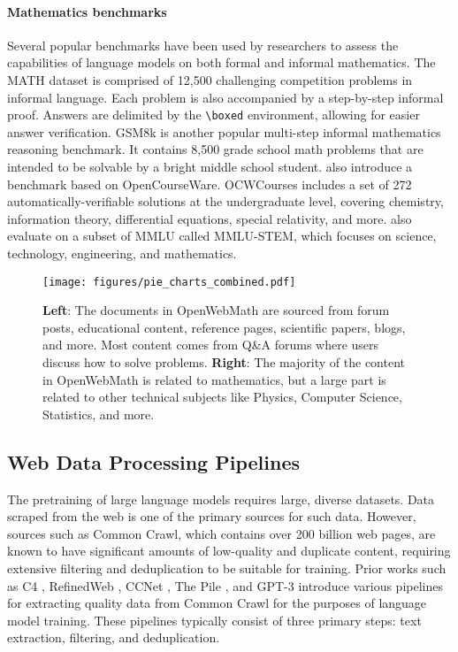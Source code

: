 \paragraph{Mathematics benchmarks} Several popular benchmarks have been used by researchers to assess the capabilities of language models on both formal and informal mathematics. The MATH dataset \citep{mathdataset} is comprised of 12,500 challenging competition problems in informal language. Each problem is also accompanied by a step-by-step informal proof. Answers are delimited by the \texttt{\textbackslash boxed} environment, allowing for easier answer verification. GSM8k \citep{cobbe2021training} is another popular multi-step informal mathematics reasoning benchmark. It contains 8,500 grade school math problems that are intended to be solvable by a bright middle school student. \citet{lewkowycz2022solving} also introduce a benchmark based on OpenCourseWare. OCWCourses includes a set of 272 automatically-verifiable solutions at the undergraduate level, covering chemistry, information theory, differential equations, special relativity, and more. \citet{lewkowycz2022solving} also evaluate on a subset of MMLU \citep{hendrycks2020measuring} called MMLU-STEM, which focuses on science, technology, engineering, and mathematics.

\begin{figure}[t!]
    \begin{center}
    \vspace{-3em}
    \texttt{[image: figures/pie\_charts\_combined.pdf]}
    \end{center}
    \caption{\textbf{Left}: The documents in OpenWebMath are sourced from forum posts, educational content, reference pages, scientific papers, blogs, and more. Most content comes from Q\&A forums where users discuss how to solve problems. \textbf{Right}: The majority of the content in OpenWebMath is related to mathematics, but a large part is related to other technical subjects like Physics, Computer Science, Statistics, and more.}
    \label{fig:doublefig}
\end{figure}

\subsection{Web Data Processing Pipelines}
The pretraining of large language models requires large, diverse datasets. Data scraped from the web is one of the primary sources for such data. However, sources such as Common Crawl, which contains over 200 billion web pages, are known to have significant amounts of low-quality and duplicate content, requiring extensive filtering and deduplication to be suitable for training. Prior works such as C4 \citep{raffel2020exploring}, RefinedWeb \citep{refined-web}, CCNet \citep{wenzek2019ccnet}, The Pile \citep{gao2020pile}, and GPT-3 \citep{gpt3} introduce various pipelines for extracting quality data from Common Crawl for the purposes of language model training. These pipelines typically consist of three primary steps: text extraction, filtering, and deduplication.

